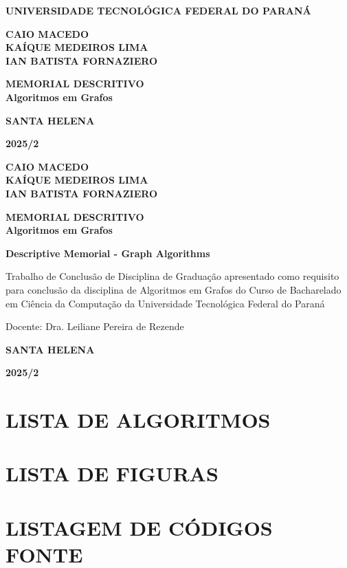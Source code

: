 \documentclass[
12pt,
a4paper,
semrecuonosumario,
sumario = abnt-6027-2012]{report}
\newcommand{\universidade}{UNIVERSIDADE TECNOLÓGICA FEDERAL DO PARANÁ}
\newcommand{\autores}{CAIO MACEDO\\ KAÍQUE MEDEIROS LIMA\\ IAN BATISTA FORNAZIERO}
\newcommand{\titulo}{MEMORIAL DESCRITIVO\\Algoritmos em Grafos}
\newcommand{\english}{Descriptive Memorial - Graph Algorithms}
\newcommand{\cidade}{SANTA HELENA}
\newcommand{\periodo}{2025/2}
\begin{document}
	\begin{titlepage}
		\centering
		{\bf \universidade\par}
		\vspace{4cm}
		{\bf\autores\par}
		\vspace{6cm}
		{\bf\titulo\par}
		\vspace{9cm}
		{\bf\cidade\par}
		{\bf\periodo\par}
		\newpage

		{\bf\autores\par}
		\vspace{3.5cm}
		{\bf\titulo\par}
		\vspace{2cm}
		{\bf\english\par}
		\vspace{3cm}
		\begin{flushright} %
			\begin{minipage}{0.5\textwidth} %
				\justifying %
				\noindent
				Trabalho de Conclusão de Disciplina de
				Graduação apresentado como requisito para
				conclusão da disciplina de Algoritmos em
				Grafos do Curso de Bacharelado em Ciência
				da Computação da Universidade Tecnológica
				Federal do Paraná

				\vspace{1em}
				\noindent
				Docente: Dra. Leiliane Pereira de Rezende
			\end{minipage}
		\end{flushright}
		\vspace{5cm}
		{\bf\cidade\par}
		{\bf\periodo\par}
		\thispagestyle{empty}
	\end{titlepage}
	\newpage
	\setcounter{page}{1}
	\section*{\centering \small\bfseries LISTA DE ALGORITMOS}

	\newpage
	\section*{\centering \small\bfseries LISTA DE FIGURAS}

	\newpage
	\section*{\centering \small\bfseries LISTAGEM DE CÓDIGOS FONTE}
\end{document}
